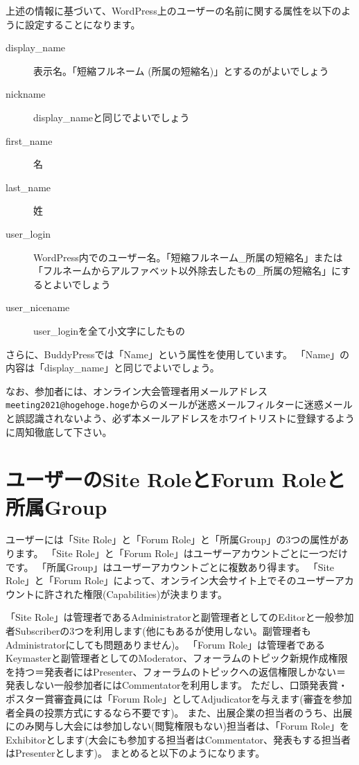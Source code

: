 \documentclass[titlepage,10pt,a4paper,uplatex]{jsbook}
\begin{document}
上述の情報に基づいて、WordPress上のユーザーの名前に関する属性を以下のように設定することになります。

\begin{description}
\item[display\_name] 表示名。「短縮フルネーム (所属の短縮名)」とするのがよいでしょう
\item[nickname] display\_nameと同じでよいでしょう
\item[first\_name] 名
\item[last\_name] 姓
\item[user\_login] WordPress内でのユーザー名。「短縮フルネーム\_所属の短縮名」または「フルネームからアルファベット以外除去したもの\_所属の短縮名」にするとよいでしょう
\item[user\_nicename] user\_loginを全て小文字にしたもの
\end{description}

さらに、BuddyPressでは「Name」という属性を使用しています。
「Name」の内容は「display\_name」と同じでよいでしょう。

なお、参加者には、オンライン大会管理者用メールアドレス\texttt{meeting2021@hogehoge.hoge}からのメールが迷惑メールフィルターに迷惑メールと誤認識されないよう、必ず本メールアドレスをホワイトリストに登録するように周知徹底して下さい。

\section{ユーザーのSite RoleとForum Roleと所属Group}

ユーザーには「Site Role」と「Forum Role」と「所属Group」の3つの属性があります。
「Site Role」と「Forum Role」はユーザーアカウントごとに一つだけです。
「所属Group」はユーザーアカウントごとに複数あり得ます。
「Site Role」と「Forum Role」によって、オンライン大会サイト上でそのユーザーアカウントに許された権限(Capabilities)が決まります。

「Site Role」は管理者であるAdministratorと副管理者としてのEditorと一般参加者Subscriberの3つを利用します(他にもあるが使用しない。副管理者もAdministratorにしても問題ありません)。
「Forum Role」は管理者であるKeymasterと副管理者としてのModerator、フォーラムのトピック新規作成権限を持つ＝発表者にはPresenter、フォーラムのトピックへの返信権限しかない＝発表しない一般参加者にはCommentatorを利用します。
ただし、口頭発表賞・ポスター賞審査員には「Forum Role」としてAdjudicatorを与えます(審査を参加者全員の投票方式にするなら不要です)。
また、出展企業の担当者のうち、出展にのみ関与し大会には参加しない(閲覧権限もない)担当者は、「Forum Role」をExhibitorとします(大会にも参加する担当者はCommentator、発表もする担当者はPresenterとします)。
まとめると以下のようになります。
\end{document}
